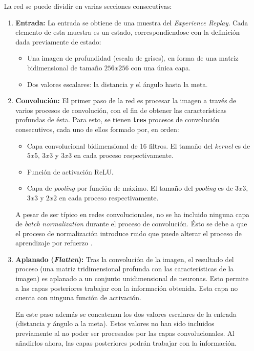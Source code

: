 La red se puede dividir en varias secciones consecutivas:
\begin{enumerate}
	\item \textbf{Entrada:} La entrada se obtiene de una muestra del \textit{Experience Replay}. Cada elemento de esta muestra es un estado, correspondiendose con la definición dada previamente de estado:
	\begin{itemize}
		\item Una imagen de profundidad (escala de grises), en forma de una matriz bidimensional de tamaño $256x256$ con una única capa.
		\item Dos valores escalares: la distancia y el ángulo hasta la meta.
	\end{itemize}
	
	\item \textbf{Convolución:} El primer paso de la red es procesar la imagen a través de varios procesos de convolución, con el fin de obtener las características profundas de ésta. Para esto, se tienen \textbf{tres} procesos de convolución consecutivos, cada uno de ellos formado por, en orden:
		\begin{itemize}
			\item Capa convolucional bidimensional de 16 filtros. El tamaño del \textit{kernel} es de $5x5$, $3x3$ y $3x3$ en cada proceso respectivamente.
			\item Función de activación ReLU.
			\item Capa de \textit{pooling} por función de máximo. El tamaño del \textit{pooling} es de $3x3$, $3x3$ y $2x2$ en cada proceso respectivamente.
		\end{itemize}
		
	A pesar de ser típico en redes convolucionales, no se ha incluido ninguna capa de \textit{batch normalization} durante el proceso de convolución. Ésto se debe a que el proceso de normalización introduce ruido que puede alterar el proceso de aprendizaje por refuerzo \cite{Salimans2016}.
	
	\item \textbf{Aplanado (\textit{Flatten}):} Tras la convolución de la imagen, el resultado del proceso (una matriz tridimensional profunda con las características de la imagen) es aplanado a un conjunto unidimensional de neuronas. Esto permite a las capas posteriores trabajar con la información obtenida. Esta capa no cuenta con ninguna función de activación.
	
	En este paso además se concatenan los dos valores escalares de la entrada (distancia y ángulo a la meta). Estos valores no han sido incluidos previamente al no poder ser procesados por las capas convolucionales. Al añadirlos ahora, las capas posteriores podrán trabajar con la información.
	

\end{enumerate}
